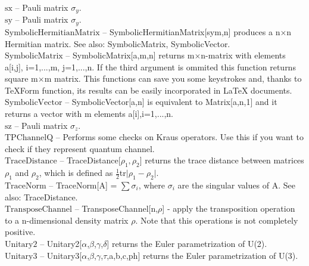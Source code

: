 \documentclass[a4paper,10pt]{scrartcl}
\begin{document}
\textbf{$ \text{sx} $ }-- Pauli matrix $ \sigma _y. $\\

\textbf{$ \text{sy} $ }-- Pauli matrix $ \sigma _y. $\\

\textbf{$ \text{SymbolicHermitianMatrix} $ }-- SymbolicHermitianMatrix[sym,n] produces a n$\times $n Hermitian matrix. See also: SymbolicMatrix, SymbolicVector.$  $\\

\textbf{$ \text{SymbolicMatrix} $ }-- SymbolicMatrix[a,m,n] returns m$\times $n-matrix with elements a[i,j], i=1,...,m, j=1,...,n. If the third argument is ommited this function returns square m$\times $m matrix. This functions can save you some keystrokes and, thanks to TeXForm function, its results can be easily incorporated in LaTeX documents.$  $\\

\textbf{$ \text{SymbolicVector} $ }-- SymbolicVector[a,n] is equivalent to Matrix[a,n,1] and it returns a vector with m elements a[i],i=1,...,n.$  $\\

\textbf{$ \text{sz} $ }-- Pauli matrix $ \sigma _z. $\\

\textbf{$ \text{TPChannelQ} $ }-- Performs some checks on Kraus operators. Use this if you want to check if they represent quantum channel.$  $\\

\textbf{$ \text{TraceDistance} $ }-- TraceDistance[$ \rho _1,\rho _2 $] returns the trace distance between matrices $ \rho _1 $ and $ \rho _2 $, which is defined as $ \frac{1}{2} $tr$|$$ \rho _1-\rho _2\text{$|$.} $\\

\textbf{$ \text{TraceNorm} $ }-- TraceNorm[A] = $\sum $$ \sigma _i $, where $ \sigma _i $ are the singular values of A. See also: TraceDistance.$  $\\

\textbf{$ \text{TransposeChannel} $ }-- TransposeChannel[n,$\rho $] - apply the transposition operation to a n-dimensional density matrix $\rho $. Note that this operations is not completely positive.$  $\\

\textbf{$ \text{Unitary2} $ }-- Unitary2[$\alpha $,$\beta $,$\gamma $,$\delta $] returns the Euler parametrization of U(2).$  $\\

\textbf{$ \text{Unitary3} $ }-- Unitary3[$\alpha $,$\beta $,$\gamma $,$\tau $,a,b,c,ph] returns the Euler parametrization of U(3).$  $\\
\end{document}
